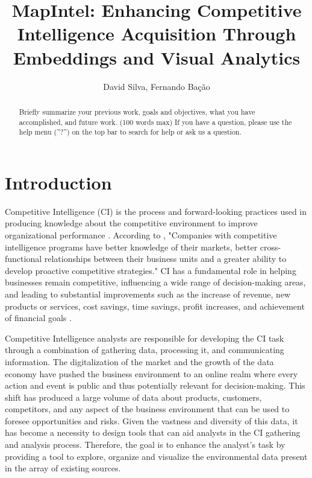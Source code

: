 \documentclass[a4paper]{article}
\title{MapIntel: Enhancing Competitive Intelligence Acquisition Through Embeddings and Visual Analytics}
\author{David Silva, Fernando Bação}
\date{}
\begin{document}
 
\maketitle

\begin{abstract}
  Briefly summarize your previous work, goals and objectives, what you have accomplished, and future work. (100 words max) If you have a question, please use the help menu (''?'') on the top bar to search for help or ask us a question.
\end{abstract}

\section{Introduction}
Competitive Intelligence (CI) is the process and forward-looking practices used in producing knowledge about the competitive environment to improve organizational performance \citet{madureira2021}. According to \citet{brod1999}, "Companies with competitive intelligence programs have better knowledge of their markets, better cross-functional relationships between their business units and a greater ability to develop proactive competitive strategies." CI has a fundamental role in helping businesses remain competitive, influencing a wide range of decision-making areas, and leading to substantial improvements such as the increase of revenue, new products or services, cost savings, time savings, profit increases, and achievement of financial goals \citep{calof2017}.

Competitive Intelligence analysts are responsible for developing the CI task through a combination of gathering data, processing it, and communicating information. The digitalization of the market and the growth of the data economy have pushed the business environment to an online realm where every action and event is public and thus potentially relevant for decision-making. This shift has produced a large volume of data about products, customers, competitors, and any aspect of the business environment that can be used to foresee opportunities and risks. Given the vastness and diversity of this data, it has become a necessity to design tools that can aid analysts in the CI gathering and analysis process. Therefore, the goal is to enhance the analyst's task by providing a tool to explore, organize and visualize the environmental data present in the array of existing sources.
\end{document}
